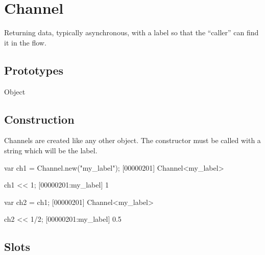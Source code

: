
\section{Channel}
Returning data, typically asynchronous, with a label so that the
``caller'' can find it in the flow.

\subsection{Prototypes}
\begin{refObjects}
\item[Object]
\end{refObjects}

\subsection{Construction}

Channels are created like any other object. The constructor must be
called with a string which will be the label.

\begin{urbiscript}[firstnumber=1]
var ch1 = Channel.new("my_label");
[00000201] Channel<my_label>

ch1 << 1;
[00000201:my_label] 1

var ch2 = ch1;
[00000201] Channel<my_label>

ch2 << 1/2;
[00000201:my_label] 0.5
\end{urbiscript}

\subsection{Slots}

